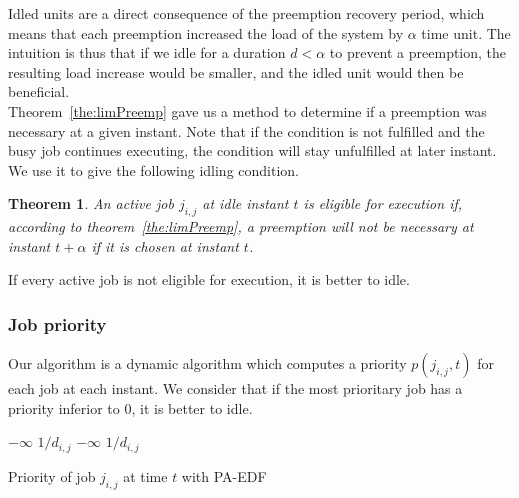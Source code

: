 \documentclass[a4paper,10pt]{article}
\newtheorem{theorem}{Theorem}
\begin{document}
        Idled units are a direct consequence of the preemption recovery period, which means that each preemption increased the load of the system by $\alpha$ time unit. The intuition is thus that if we idle for a duration $d < \alpha$ to prevent a preemption, the resulting load increase would be smaller, and the idled unit would then be beneficial.\\

        Theorem~\ref{the:limPreemp} gave us a method to determine if a preemption was necessary at a given instant. Note that if the condition is not fulfilled and the busy job continues executing, the condition will stay unfulfilled at later instant. We use it to give the following idling condition.

        \begin{theorem}
            An active job $j_{i,j}$ at idle instant $t$ is eligible for execution if, according to theorem~\ref{the:limPreemp}, a preemption will not be necessary at instant $t + \alpha$ if it is chosen at instant $t$.
        \end{theorem}

        If every active job is not eligible for execution, it is better to idle.

    \subsubsection{Job priority}

        Our algorithm is a dynamic algorithm which computes a priority $p(j_{i,j}, t)$ for each job at each instant. We consider that if the most prioritary job has a priority inferior to 0, it is better to idle.

        \begin{algorithm}[H]
            \begin{algorithmic}[1]
                        \RETURN $- \infty$
                    \ELSE
                        \RETURN $1 / d_{i,j}$
                    \ENDIF
                        \RETURN $- \infty$
                    \ELSE
                    \ENDIF
                \ENDIF
                \RETURN $1 / d_{i,j}$
            \end{algorithmic}
                \caption{Priority of job $j_{i,j}$ at time $t$ with PA-EDF}
                \label{alg:prio}
            \end{algorithm}
\end{document}
